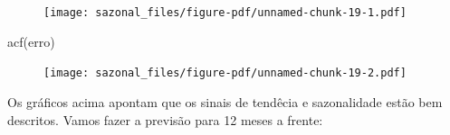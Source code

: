 \documentclass[
  letterpaper,
  DIV=11,
  numbers=noendperiod]{scrreprt}
\newenvironment{Shaded}{\begin{snugshade}}{\end{snugshade}}
\newcommand{\FunctionTok}[1]{\textcolor[rgb]{0.28,0.35,0.67}{#1}}
\newcommand{\NormalTok}[1]{\textcolor[rgb]{0.00,0.23,0.31}{#1}}
\begin{document}
\begin{figure}[H]

{\centering \texttt{[image: sazonal\_files/figure-pdf/unnamed-chunk-19-1.pdf]}

}

\end{figure}

\begin{Shaded}
\begin{Highlighting}[]
\FunctionTok{acf}\NormalTok{(erro)}
\end{Highlighting}
\end{Shaded}

\begin{figure}[H]

{\centering \texttt{[image: sazonal\_files/figure-pdf/unnamed-chunk-19-2.pdf]}

}

\end{figure}

Os gráficos acima apontam que os sinais de tendêcia e sazonalidade estão
bem descritos. Vamos fazer a previsão para 12 meses a frente:
\end{document}
